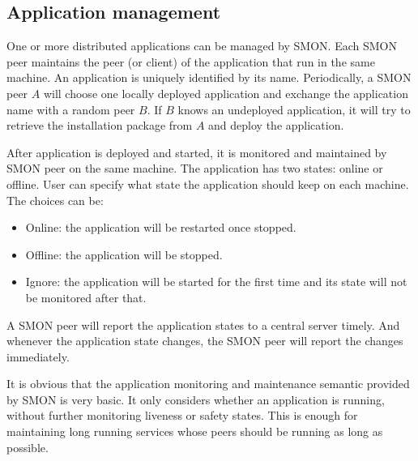 \subsection{Application management}

One or more distributed applications can be managed by SMON.
Each SMON peer maintains the peer (or client) of the
application that run in the same machine. An application is
uniquely identified by its name.  Periodically, a SMON peer
$A$ will choose one locally deployed application and
exchange the application name with a random peer $B$. If $B$
knows an undeployed application, it will try to retrieve the
installation package from $A$ and deploy the application.



After application is deployed and started, it is monitored
and maintained by SMON peer on the same machine.  The
application has two states: online or offline.  User can
specify what state the application should keep on each
machine. The choices can be:

\begin{itemize}
  \item Online: the application will be restarted once
  stopped.
  \item Offline: the application will be stopped.
  \item Ignore: the application will be started for the
  first time and its state will not be monitored after
  that.
\end{itemize}

A SMON peer will report the application states to a central
server timely. And whenever the application state changes,
the SMON peer will report the changes immediately.

It is obvious that the application monitoring and
maintenance semantic provided by SMON is very basic. It
only considers whether an application is running, without
further monitoring liveness or safety states. This
is enough for maintaining long running services whose peers
should be running as long as possible.

